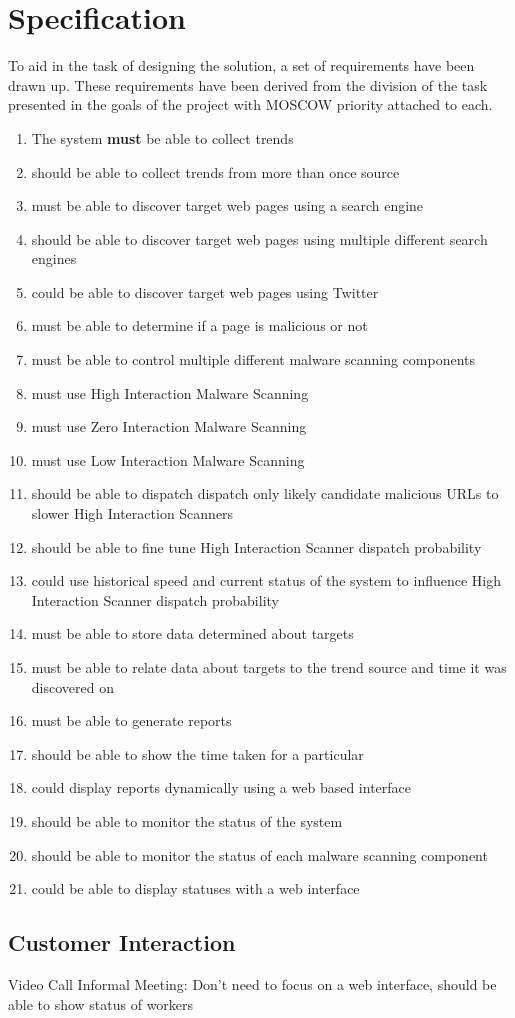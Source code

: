 \clearpage
\section{Specification}

To aid in the task of designing the solution, a set of requirements have been drawn up. These requirements have been derived from the division of the task presented in the goals of the project with MOSCOW priority attached to each.

\begin{enumerate}
    \item The system \textbf{must} be able to collect trends
    \item should be able to collect trends from more than once source
    
    \item must be able to discover target web pages using a search engine
    \item should be able to discover target web pages using multiple different search engines
    \item could be able to discover target web pages using Twitter
    
    \item must be able to determine if a page is malicious or not
    \item must be able to control multiple different malware scanning components
    \item must use High Interaction Malware Scanning
    \item must use Zero Interaction Malware Scanning
    \item must use Low Interaction Malware Scanning
    \item should be able to dispatch dispatch only likely candidate malicious URLs to slower High Interaction Scanners
    \item should be able to fine tune High Interaction Scanner dispatch probability
    \item could use historical speed and current status of the system to influence High Interaction Scanner dispatch probability

    \item must be able to store data determined about targets
    \item must be able to relate data about targets to the trend source and time it was discovered on
    \item must be able to generate reports
    \item should be able to show the time taken for a particular 
    \item could display reports dynamically using a web based interface
    \item should be able to monitor the status of the system
    \item should be able to monitor the status of each malware scanning component
    \item could be able to display statuses with a web interface
\end{enumerate}

\subsection{Customer Interaction}
Video Call
Informal Meeting: Don't need to focus on a web interface, should be able to show status of workers

